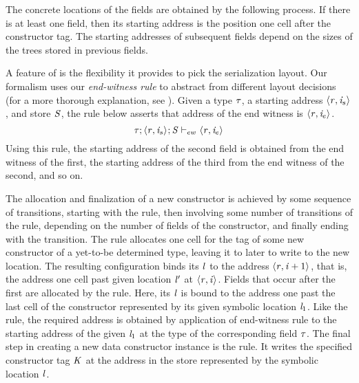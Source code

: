 The concrete locations of the fields are obtained by the following
process.
%
If there is at least one field, then its starting address is the
position one cell after the constructor tag.
%
The starting addresses of subsequent fields depend on the sizes of the
trees stored in previous fields.

A feature of \ourcalc{} is the flexibility it provides to pick the
serialization layout.
%
Our formalism uses our \emph{end-witness rule} to abstract from different layout
decisions (for a more thorough explanation, see ).
%
Given a type $\mathit{\tau}$, a starting address
$\langle \mathit{r}, \mathit{i}_{s} \rangle ^{}$, and store $\mathit{S}$, the rule below
asserts that address of the end witness is
$\langle \mathit{r}, \mathit{i}_{e} \rangle ^{}$.
%
\begin{displaymath}
  \mathit{\tau};\langle \mathit{r}, \mathit{i}_{s} \rangle ^{};\mathit{S} \vdash_{ew} \langle \mathit{r}, \mathit{i}_{e} \rangle ^{}
\end{displaymath}
%
Using this rule, the starting address of the second field is obtained
from the end witness of the first, the starting address of the
third from the end witness of the second, and so on.

The allocation and finalization of a new constructor is achieved by
some sequence of transitions, starting with the \textsc{\dletloctag{}} rule, then
involving some number of transitions of the \textsc{\dletlocafter{}} rule,
depending on the number of fields of the constructor, and finally
ending with the \textsc{\ddatacon{}} transition.
%
The \textsc{\dletloctag{}} rule allocates one cell for the tag of some new
constructor of a yet-to-be determined type, leaving it to later to
write to the new location.
%
The resulting configuration binds its $\mathit{l}$ to the address
$\langle \mathit{r}, \mathit{i}+1 \rangle ^{}$, that is, the address one cell past
given location $\mathit{l}'$ at $\langle \mathit{r}, \mathit{i} \rangle ^{}$.
%
Fields that occur after the first are allocated by the
\textsc{\dletlocafter{}} rule.
%
Here, its $\mathit{l}$ is bound to the address  one
past the last cell of the constructor represented by its given
symbolic location $\mathit{l}_1$.
%
Like the \textsc{\dcase{}} rule, the required address is obtained by
application of end-witness rule to the starting address of the given
$\mathit{l}_1$ at the type of the corresponding field $\mathit{\tau}$.
%
The final step in creating a new data constructor instance
is the \textsc{\ddatacon{}} rule.
%
It writes the specified constructor tag $\mathit{K}$ at the address in the
store represented by the symbolic location $\mathit{l}$.

